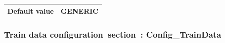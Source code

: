 \documentclass{template/openetcs}
\begin{document}
\begin{itemize}
\begin{longtable}{|l|l|}
				\hline
				
					\begin{minipage}[t]{0.22\linewidth} \textbf{Default value}	\end{minipage} 
				&	\begin{minipage}[t]{0.78\linewidth} GENERIC \end{minipage} \\
				
				\hline
				
			\end{longtable}
	\end{itemize}
	
\subsubsection{Train data configuration section : Config\_TrainData}
\end{document}
